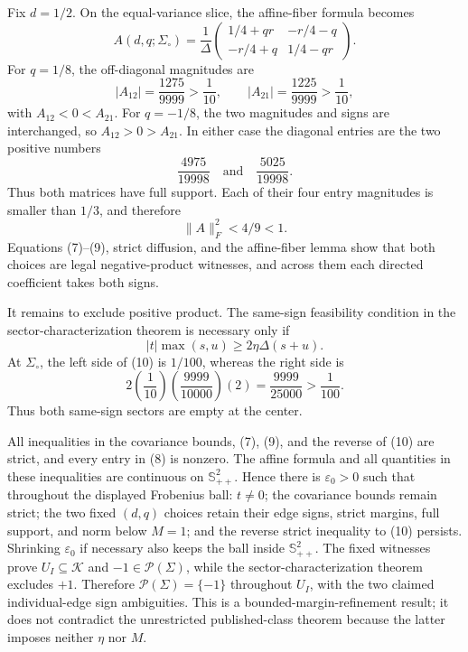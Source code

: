 Fix \(d=1/2\). On the equal-variance slice, the affine-fiber formula becomes
\[
A(d,q;\Sigma_{\circ})
=\frac1\Delta
\begin{pmatrix}
1/4+qr&-r/4-q\\
-r/4+q&1/4-qr
\end{pmatrix}. \tag{6}
\]
For \(q=1/8\), the off-diagonal magnitudes are
\[
|A_{12}|=\frac{1275}{9999}>\frac1{10},
\qquad
|A_{21}|=\frac{1225}{9999}>\frac1{10}, \tag{7}
\]
with \(A_{12}<0<A_{21}\). For \(q=-1/8\), the two magnitudes and signs are interchanged, so \(A_{12}>0>A_{21}\). In either case the diagonal entries are the two positive numbers
\[
\frac{4975}{19998}
\quad\text{and}\quad
\frac{5025}{19998}. \tag{8}
\]
Thus both matrices have full support. Each of their four entry magnitudes is smaller than \(1/3\), and therefore
\[
\lVert A\rVert_F^2<4/9<1. \tag{9}
\]
Equations (7)--(9), strict diffusion, and the affine-fiber lemma show that both choices are legal negative-product witnesses, and across them each directed coefficient takes both signs.

It remains to exclude positive product. The same-sign feasibility condition in the sector-characterization theorem is necessary only if
\[
|t|\max(s,u)\ge2\eta\Delta(s+u). \tag{10}
\]
At \(\Sigma_{\circ}\), the left side of (10) is \(1/100\), whereas the right side is
\[
2\left(\frac1{10}\right)\left(\frac{9999}{10000}\right)(2)
=\frac{9999}{25000}>\frac1{100}. \tag{11}
\]
Thus both same-sign sectors are empty at the center.

All inequalities in the covariance bounds, (7), (9), and the reverse of (10) are strict, and every entry in (8) is nonzero. The affine formula and all quantities in these inequalities are continuous on \(\mathbb S_{++}^{2}\). Hence there is \(\varepsilon_0>0\) such that throughout the displayed Frobenius ball: \(t\ne0\); the covariance bounds remain strict; the two fixed \((d,q)\) choices retain their edge signs, strict margins, full support, and norm below \(M=1\); and the reverse strict inequality to (10) persists. Shrinking \(\varepsilon_0\) if necessary also keeps the ball inside \(\mathbb S_{++}^{2}\). The fixed witnesses prove \(U_I\subseteq\mathcal K\) and \(-1\in\mathcal P(\Sigma)\), while the sector-characterization theorem excludes \(+1\). Therefore \(\mathcal P(\Sigma)=\{-1\}\) throughout \(U_I\), with the two claimed individual-edge sign ambiguities. This is a bounded-margin-refinement result; it does not contradict the unrestricted published-class theorem because the latter imposes neither \(\eta\) nor \(M\).
